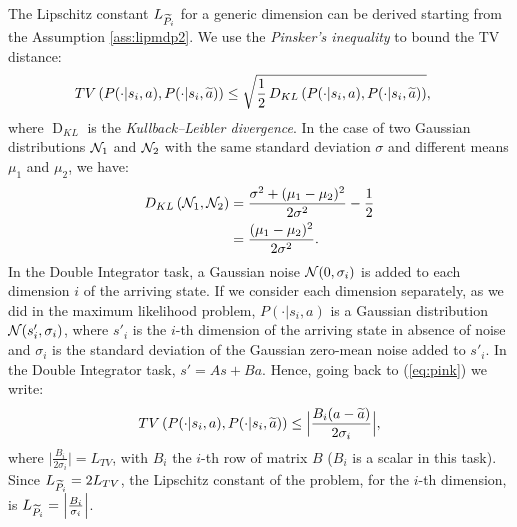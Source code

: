 \newline
The Lipschitz constant $L_{\widetilde{P}_{i}}$ for a generic dimension can be derived starting from the Assumption \ref{ass:lipmdp2}. We use the \emph{Pinsker's inequality} to bound the \ac{TV} distance:
\begin{align}
\mathop{TV}\left(P(\cdot|s_{i},a), P(\cdot| s_{i},\widetilde{a})\right) &\leq \sqrt{\frac{1}{2}\mathop{D_{KL}}\left(P(\cdot|s_{i},a), P(\cdot| s_{i},\widetilde{a})\right)}, \label{eq:pink}
\end{align}
where $\mathop{D}_{KL}$ is the \emph{Kullback–Leibler divergence}. In the case of two Gaussian distributions $\mathcal{N}_1$ and $\mathcal{N}_2$ with the same standard deviation $\sigma$ and different means $\mu_1$ and $\mu_2$, we have:
\begin{align}
	\mathop{D_{KL}}\left(\mathcal{N}_1, \mathcal{N}_2\right) &= \frac{\sigma^2 + (\mu_1 - \mu_2)^2}{2\sigma^2} - \frac{1}{2} \nonumber\\
	&= \frac{(\mu_1 - \mu_2)^2}{2\sigma^2}.
\end{align}
In the Double Integrator task, a Gaussian noise $\mathcal{N}(0, \sigma_{i})$ is added to each dimension $i$ of the arriving state. If we consider each dimension separately, as we did in the maximum likelihood problem, $P(\cdot|s_{i},a)$ is a Gaussian distribution $\mathcal{N}(s'_{i}, \sigma_{i})$, where $s'_{i}$ is the $i$-th dimension of the arriving state in absence of noise and $\sigma_{i}$ is the standard deviation of the Gaussian zero-mean noise added to $s'_{i}$. In the Double Integrator task, $s' = As + Ba$. Hence, going back to (\ref{eq:pink}) we write:
\begin{align}
	\mathop{TV}\left(P(\cdot|s_{i},a), P(\cdot| s_{i},\widetilde{a})\right) \leq \Big| \frac{B_{i} (a - \widetilde{a})}{2\sigma_{i}}\Big|,
\end{align}
where $\Big| \frac{B_{i}}{2\sigma_{i}} \Big| = L_{TV}$, with $B_{i}$ the $i$-th row of matrix $B$ ($B_{i}$ is a scalar in this task). Since $L_{\widetilde{P}_{i}}=2L_{TV}$, the Lipschitz constant of the problem, for the $i$-th dimension, is $L_{\widetilde{P}_{i}} = \Big| \frac{B_{i}}{\sigma_{i}} \Big|$.